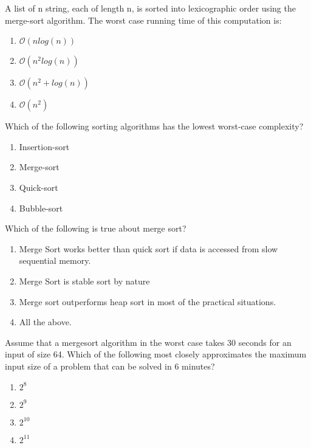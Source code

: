 \begin{problem}
A list of n string, each of length n, is sorted into lexicographic order using the merge-sort algorithm. The worst case running time of this computation is:
\begin{enumerate}
\item $\mathcal{O}(nlog(n))$
\item $\mathcal{O}(n^2log(n))$
\item $\mathcal{O}(n^2 + log(n))$
\item $\mathcal{O}(n^2)$
\end{enumerate}

\end{problem}


\begin{problem}
Which of the following sorting algorithms has the lowest worst-case complexity?
\begin{enumerate}
\item Insertion-sort
\item Merge-sort
\item Quick-sort
\item Bubble-sort
\end{enumerate}

\end{problem}



\begin{problem}
Which of the following is true about merge sort?
\begin{enumerate}
\item Merge Sort works better than quick sort if data is accessed from slow sequential memory.
\item Merge Sort is stable sort by nature
\item Merge sort outperforms heap sort in most of the practical situations.
\item All the above.
\end{enumerate}

\end{problem}


\begin{problem}
Assume that a mergesort algorithm in the worst case takes 30 seconds for an input of size 64. Which of the following most closely approximates the maximum input size of a problem that can be solved in 6 minutes?
\begin{enumerate}
\item $2^8$
\item $2^9$
\item $2^{10}$
\item $2^{11}$
\end{enumerate}

\end{problem}



